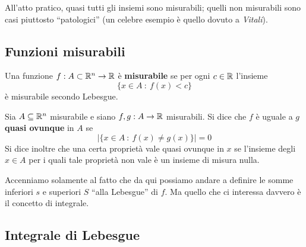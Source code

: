 All'atto pratico, quasi tutti gli insiemi sono misurabili; quelli non misurabili sono casi piuttosto ``patologici'' (un celebre esempio è quello dovuto a \textit{Vitali}).

\subsection{Funzioni misurabili}

\begin{defn}
Una funzione $f: A\subset \mathbb{R}^{n}\rightarrow \mathbb{R}$ è \textbf{misurabile} se per ogni $c\in\mathbb{R}$ l'insieme
\begin{equation*}
\{x\in A\ :\ f(x) < c\}
\end{equation*}
è misurabile secondo Lebesgue.
\end{defn}

\begin{defn}
Sia $A\subseteq\mathbb{R}^n$ misurabile e siano $f,g:A\to\mathbb{R}$ misurabili. Si dice che $f$ è uguale a $g$ \textbf{quasi ovunque} in $A$ se
$$
|\{x\in A\ :\ f(x)\neq g(x)\}|=0
$$
Si dice inoltre che una certa proprietà vale quasi ovunque in $x$ se l'insieme degli $x\in A$ per i quali tale proprietà non vale è un insieme di misura nulla.
\end{defn}

Accenniamo solamente al fatto che da qui possiamo andare a definire le somme inferiori $s$ e superiori $S$ ``alla Lebesgue'' di $f$. Ma quello che ci interessa davvero è il concetto di integrale.

\newpage

\subsection{Integrale di Lebesgue}

